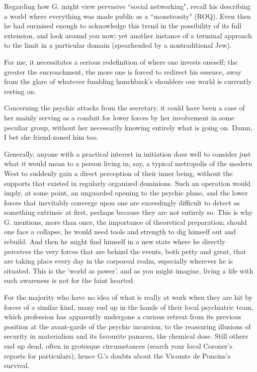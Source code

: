 \begin{footnotesize}
\begin{sffamily}
Regarding how G. might view pervasive ``social networking", recall his describing a world where everything was made public as a ``monstrosity" (ROQ). Even then he had surmised enough to acknowledge this trend in the possibility of its full extension, and look around you now; yet another instance of a terminal approach to the limit in a particular domain (spearheaded by a nontraditional Jew).

For me, it necessitates a serious redefinition of where one invests oneself; the greater the encroachment, the more one is forced to redirect his essence, away from the glare of whatever fumbling hunchback's shoulders our world is currently resting on.

Concerning the psychic attacks from the secretary, it could have been a case of her mainly serving as a conduit for lower forces by her involvement in some peculiar group, without her necessarily knowing entirely what is going on. Damn, I bet she friend-zoned him too.

Generally, anyone with a practical interest in initiation does well to consider just what it would mean to a person living in, say, a typical metropolis of the modern West to suddenly gain a direct perception of their inner being, without the supports that existed in regularly organized dominions. Such an operation would imply, at some point, an unguarded opening to the psychic plane, and the lower forces that inevitably converge upon one are exceedingly difficult to detect as something extrinsic at first, perhaps because they are not entirely so. This is why G. mentions, more than once, the importance of theoretical preparation; should one face a collapse, he would need tools and strength to dig himself out and rebuild. And then he might find himself in a new state where he directly perceives the very forces that are behind the events, both petty and great, that are taking place every day in the corporeal realm, especially wherever he is situated. This is the `world as power'. and as you might imagine, living a life with such awareness is not for the faint hearted.

For the majority who have no idea of what is really at work when they are hit by forces of a similar kind, many end up in the hands of their local psychiatric team, which profession has apparently undergone a curious retreat from its previous position at the avant-garde of the psychic incursion, to the reassuring illusions of security in materialism and its favourite panacea, the chemical dose. Still others end up dead, often in grotesque circumstances (search your local Coroner's reports for particulars), hence G.'s doubts about the Vicomte de Poncins's survival.



\end{sffamily}
\end{footnotesize}
